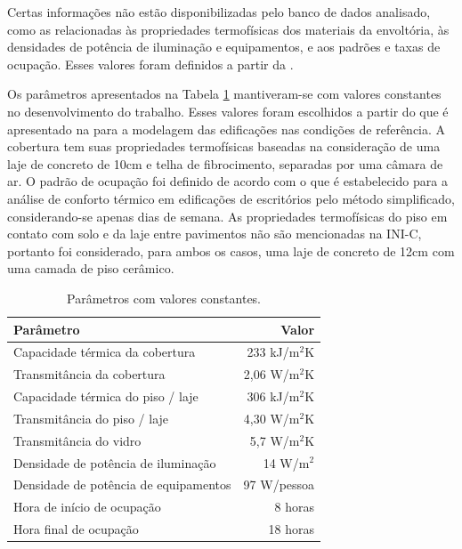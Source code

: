 \documentclass[brazil,hardcopy,openany,a5paper]{ufscthesis}
\begin{document}
		Certas informações não estão disponibilizadas pelo banco de dados analisado, como as relacionadas às propriedades termofísicas dos materiais da envoltória, às densidades de potência de iluminação e equipamentos, e aos padrões e taxas de ocupação. Esses valores foram definidos a partir da  \cite{INIC}. %
		
		Os parâmetros apresentados na Tabela \ref{table:paramconst} mantiveram-se com valores constantes no desenvolvimento do trabalho. Esses valores foram escolhidos a partir do que é apresentado na  \cite{INIC} para a modelagem das edificações nas condições de referência. A cobertura tem suas propriedades termofísicas baseadas na consideração de uma laje de concreto de 10cm e telha de fibrocimento, separadas por uma câmara de ar. O padrão de ocupação foi definido de acordo com o que é estabelecido para a análise de conforto térmico em edificações de escritórios pelo método simplificado, considerando-se apenas dias de semana. As propriedades termofísicas do piso em contato com solo e da laje entre pavimentos não são mencionadas na INI-C, portanto foi considerado, para ambos os casos, uma laje de concreto de 12cm com uma camada de piso cerâmico.
		
		\begin{table}[h]
			\centering
			\caption{Parâmetros com valores constantes.}
			\label{table:paramconst}
			\begin{tabular}{|l |r |}
				\hline
				\textbf{Parâmetro} & \textbf{Valor} \\
				\hline
				Capacidade térmica da cobertura & 233 kJ/m$^2$K \\
				\hline
				Transmitância da cobertura & 2,06 W/m$^2$K \\
				\hline
				Capacidade térmica do piso / laje & 306 kJ/m$^2$K \\
				\hline
				Transmitância do piso / laje & 4,30 W/m$^2$K \\
				\hline
				Transmitância do vidro & 5,7 W/m$^2$K \\
				\hline 
				Densidade de potência de iluminação & 14 W/m$^2$ \\
				\hline 
				Densidade de potência de equipamentos & 97 W/pessoa \\
				\hline 
				Hora de início de ocupação & 8 horas \\
				\hline 
				Hora final de ocupação & 18 horas \\
				\hline 
			\end{tabular}
		\end{table}
		
\end{document}
